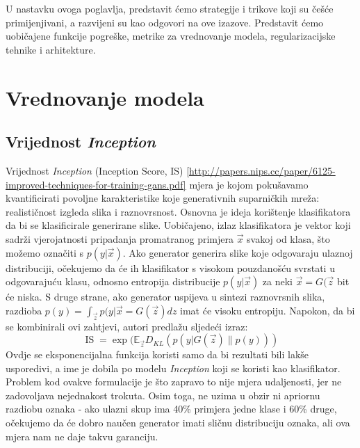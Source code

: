 U nastavku ovoga poglavlja, predstavit ćemo strategije i trikove koji su češće primijenjivani, a razvijeni su kao odgovori na ove izazove. Predstavit ćemo uobičajene funkcije pogreške, metrike za vrednovanje modela, regularizacijske tehnike i arhitekture.

\section{Vrednovanje modela}
\subsection{Vrijednost \textit{Inception}}
Vrijednost \textit{Inception} \engl(Inception Score, IS) \ref{http://papers.nips.cc/paper/6125-improved-techniques-for-training-gans.pdf} mjera je kojom pokušavamo kvantificirati povoljne karakteristike koje generativnih suparničkih mreža: realističnost izgleda slika i raznovrsnost. Osnovna je ideja korištenje klasifikatora da bi se klasificirale generirane slike. Uobičajeno, izlaz klasifikatora je vektor koji sadrži vjerojatnosti pripadanja promatranog primjera $\vec{x}$ svakoj od klasa, što možemo označiti s $p(y|\vec{x})$. Ako generator generira slike koje odgovaraju ulaznoj distribuciji, očekujemo da će ih klasifikator s visokom pouzdanošću svrstati u odgovarajuću klasu, odnosno entropija distribucije $p(y|\vec{x})$ za neki $\vec{x} = G(\vec{z}$ bit će niska. S druge strane, ako generator uspijeva u sintezi raznovrsnih slika, razdioba $p(y) = \int_{\vec{z}}p(y|\vec{x} = G(\vec{z})dz$ imat će visoku entropiju. Napokon, da bi se kombinirali ovi zahtjevi, autori predlažu sljedeći izraz:
\begin{equation}
	\operatorname*{IS} = \exp(\mathbb{E}_{\vec{z}} D_{KL}(p(y|G(\vec{z})\|p(y)))
\end{equation}
Ovdje se eksponencijalna funkcija koristi samo da bi rezultati bili lakše usporedivi, a ime je dobila po modelu \textit{Inception} koji se koristi kao klasifikator. Problem kod ovakve formulacije je što zapravo to nije mjera udaljenosti, jer ne zadovoljava nejednakost trokuta. Osim toga, ne uzima u obzir ni apriornu razdiobu oznaka - ako ulazni skup ima 40\% primjera jedne klase i 60\% druge, očekujemo da će dobro naučen generator imati sličnu distribuciju oznaka, ali ova mjera nam ne daje takvu garanciju. 

